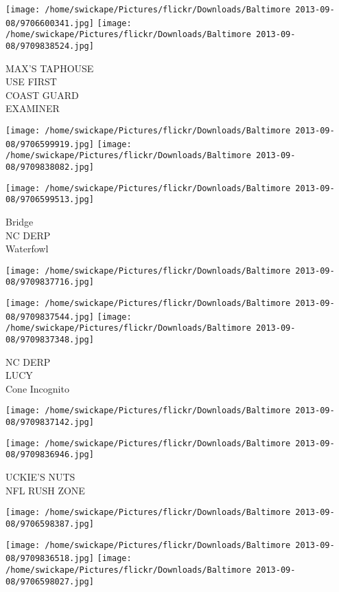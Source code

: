 \documentclass[10pt,letterpaper]{article}
\begin{document}
\texttt{[image: /home/swickape/Pictures/flickr/Downloads/Baltimore 2013-09-08/9706600341.jpg]}
\texttt{[image: /home/swickape/Pictures/flickr/Downloads/Baltimore 2013-09-08/9709838524.jpg]}

MAX'S TAPHOUSE\\
USE FIRST\\
COAST GUARD\\
EXAMINER
\pagebreak

\texttt{[image: /home/swickape/Pictures/flickr/Downloads/Baltimore 2013-09-08/9706599919.jpg]}
\texttt{[image: /home/swickape/Pictures/flickr/Downloads/Baltimore 2013-09-08/9709838082.jpg]}

\texttt{[image: /home/swickape/Pictures/flickr/Downloads/Baltimore 2013-09-08/9706599513.jpg]}

Bridge\\
NC DERP\\
Waterfowl
\pagebreak

\texttt{[image: /home/swickape/Pictures/flickr/Downloads/Baltimore 2013-09-08/9709837716.jpg]}

\vspace{0.25in}
\texttt{[image: /home/swickape/Pictures/flickr/Downloads/Baltimore 2013-09-08/9709837544.jpg]}
\texttt{[image: /home/swickape/Pictures/flickr/Downloads/Baltimore 2013-09-08/9709837348.jpg]}

NC DERP\\
LUCY\\
Cone Incognito
\pagebreak

\texttt{[image: /home/swickape/Pictures/flickr/Downloads/Baltimore 2013-09-08/9709837142.jpg]}

\vspace{0.25in}
\texttt{[image: /home/swickape/Pictures/flickr/Downloads/Baltimore 2013-09-08/9709836946.jpg]}

UCKIE'S NUTS\\
NFL RUSH ZONE
\pagebreak

\texttt{[image: /home/swickape/Pictures/flickr/Downloads/Baltimore 2013-09-08/9706598387.jpg]}

\vspace{0.25in}
\texttt{[image: /home/swickape/Pictures/flickr/Downloads/Baltimore 2013-09-08/9709836518.jpg]}
\texttt{[image: /home/swickape/Pictures/flickr/Downloads/Baltimore 2013-09-08/9706598027.jpg]}
\end{document}
